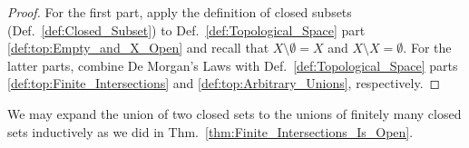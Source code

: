 \documentclass{book}                                                           %
\begin{document}
                \begin{proof}
                    For the first part, apply the definition of closed subsets
                    (Def.~\ref{def:Closed_Subset}) to
                    Def.~\ref{def:Topological_Space} part
                    \ref{def:top:Empty_and_X_Open} and recall that
                    $X\setminus\emptyset=X$ and $X\setminus{X}=\emptyset$. For
                    the latter parts, combine De Morgan's Laws with
                    Def.~\ref{def:Topological_Space} parts
                    \ref{def:top:Finite_Intersections} and
                    \ref{def:top:Arbitrary_Unions}, respectively.
                \end{proof}
                We may expand the union of two closed sets to the unions of
                finitely many closed sets inductively as we did in
                Thm.~\ref{thm:Finite_Intersections_Is_Open}.
\end{document}
